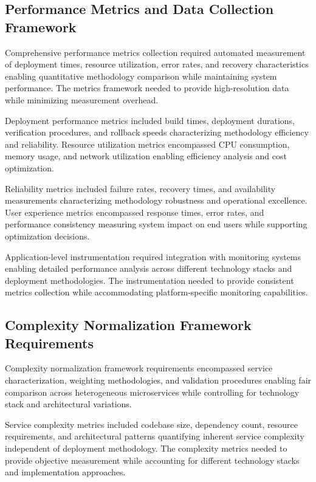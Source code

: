 \subsection{Performance Metrics and Data Collection Framework}

Comprehensive performance metrics collection required automated measurement of deployment times, resource utilization, error rates, and recovery characteristics enabling quantitative methodology comparison while maintaining system performance. The metrics framework needed to provide high-resolution data while minimizing measurement overhead.

Deployment performance metrics included build times, deployment durations, verification procedures, and rollback speeds characterizing methodology efficiency and reliability. Resource utilization metrics encompassed CPU consumption, memory usage, and network utilization enabling efficiency analysis and cost optimization.


Reliability metrics included failure rates, recovery times, and availability measurements characterizing methodology robustness and operational excellence. User experience metrics encompassed response times, error rates, and performance consistency measuring system impact on end users while supporting optimization decisions.

Application-level instrumentation required integration with monitoring systems enabling detailed performance analysis across different technology stacks and deployment methodologies. The instrumentation needed to provide consistent metrics collection while accommodating platform-specific monitoring capabilities.

\subsection{Complexity Normalization Framework Requirements}

Complexity normalization framework requirements encompassed service characterization, weighting methodologies, and validation procedures enabling fair comparison across heterogeneous microservices while controlling for technology stack and architectural variations.

Service complexity metrics included codebase size, dependency count, resource requirements, and architectural patterns quantifying inherent service complexity independent of deployment methodology. The complexity metrics needed to provide objective measurement while accounting for different technology stacks and implementation approaches.

